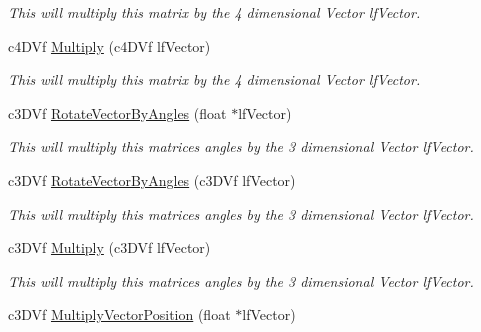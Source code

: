 \begin{DoxyCompactItemize}
\begin{DoxyCompactList}\small\item\em This will multiply this matrix by the 4 dimensional Vector lfVector. \end{DoxyCompactList}\item 
\hypertarget{classc_matrix4_a04a7a29ceff673479de7500fbfe332ae}{
c4DVf \hyperlink{classc_matrix4_a04a7a29ceff673479de7500fbfe332ae}{Multiply} (c4DVf lfVector)}
\label{classc_matrix4_a04a7a29ceff673479de7500fbfe332ae}

\begin{DoxyCompactList}\small\item\em This will multiply this matrix by the 4 dimensional Vector lfVector. \end{DoxyCompactList}\item 
\hypertarget{classc_matrix4_a95d71e1823bbca3ddd9834e2d9af1b46}{
c3DVf \hyperlink{classc_matrix4_a95d71e1823bbca3ddd9834e2d9af1b46}{RotateVectorByAngles} (float $\ast$lfVector)}
\label{classc_matrix4_a95d71e1823bbca3ddd9834e2d9af1b46}

\begin{DoxyCompactList}\small\item\em This will multiply this matrices angles by the 3 dimensional Vector lfVector. \end{DoxyCompactList}\item 
\hypertarget{classc_matrix4_abd6f4049cde35ad7b72d395762c17c0f}{
c3DVf \hyperlink{classc_matrix4_abd6f4049cde35ad7b72d395762c17c0f}{RotateVectorByAngles} (c3DVf lfVector)}
\label{classc_matrix4_abd6f4049cde35ad7b72d395762c17c0f}

\begin{DoxyCompactList}\small\item\em This will multiply this matrices angles by the 3 dimensional Vector lfVector. \end{DoxyCompactList}\item 
\hypertarget{classc_matrix4_a832568da5c48ddd89b5f6feb99f3c528}{
c3DVf \hyperlink{classc_matrix4_a832568da5c48ddd89b5f6feb99f3c528}{Multiply} (c3DVf lfVector)}
\label{classc_matrix4_a832568da5c48ddd89b5f6feb99f3c528}

\begin{DoxyCompactList}\small\item\em This will multiply this matrices angles by the 3 dimensional Vector lfVector. \end{DoxyCompactList}\item 
\hypertarget{classc_matrix4_a011321db92a3b461c46fdbf96e16fe7b}{
c3DVf \hyperlink{classc_matrix4_a011321db92a3b461c46fdbf96e16fe7b}{MultiplyVectorPosition} (float $\ast$lfVector)}
\label{classc_matrix4_a011321db92a3b461c46fdbf96e16fe7b}


\end{DoxyCompactItemize}

